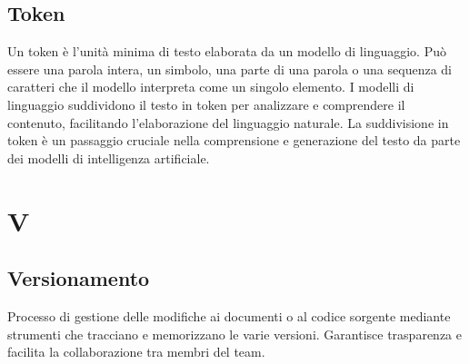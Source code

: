 \documentclass{article}
\begin{document}
\subsection{Token}
Un token è l'unità minima di testo elaborata da un modello di linguaggio. Può essere una parola intera, un simbolo, una parte di una parola o una sequenza di caratteri che il modello interpreta come un singolo elemento. I modelli di linguaggio suddividono il testo in token per analizzare e comprendere il contenuto, facilitando l'elaborazione del linguaggio naturale. La suddivisione in token è un passaggio cruciale nella comprensione e generazione del testo da parte dei modelli di intelligenza artificiale.
\newpage

\section{V}

\subsection{Versionamento}
Processo di gestione delle modifiche ai documenti o al codice sorgente mediante strumenti che tracciano e memorizzano le varie versioni. Garantisce trasparenza e facilita la collaborazione tra membri del team.
\end{document}
